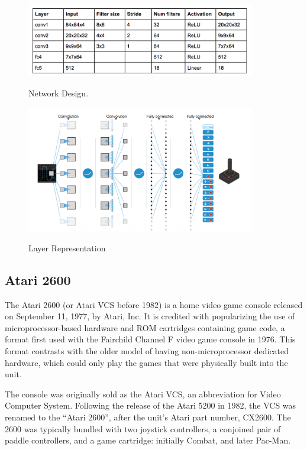 \documentclass[a4paper,11pt]{article}
\begin{document}
					\begin{figure}[!ht]
						\begin{centering}
							\includegraphics[width=10cm]{../Design/images/deep2.png}\\
							\caption{Network Design.}
						\end{centering}
					\end{figure}

					\begin{figure}[!ht]
						\begin{centering}
							\includegraphics[width=10cm]{../Design/images/deep4.png}\\
							\caption{Layer Representation}
						\end{centering}
					\end{figure}
		\subsection{Atari 2600}
		The Atari 2600 (or Atari VCS before 1982) is a home video game console released on September 11, 1977, by Atari, Inc. It is credited with popularizing the use of microprocessor-based hardware and ROM cartridges containing game code, a format first used with the Fairchild Channel F video game console in 1976. This format contrasts with the older model of having non-microprocessor dedicated hardware, which could only play the games that were physically built into the unit.

		The console was originally sold as the Atari VCS, an abbreviation for Video Computer System. Following the release of the Atari 5200 in 1982, the VCS was renamed to the ``Atari 2600'', after the unit's Atari part number, CX2600. The 2600 was typically bundled with two joystick controllers, a conjoined pair of paddle controllers, and a game cartridge: initially Combat, and later Pac-Man.
\end{document}
